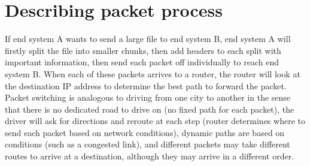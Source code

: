 \documentclass{article}
\begin{document}
\section{Describing packet process}
If end system A wants to send a large file to end system B, end system A will firstly split the file into smaller chunks, then add headers to each split with important information, then send each packet off individually to reach end system B. When each of these packets arrives to a router, the router will look at the destination IP address to determine the best path to forward the packet. Packet switching is analogous to driving from one city to another in the sense that there is no dedicated road to drive on (no fixed path for each packet), the driver will ask for directions and reroute at each step (router determines where to send each packet based on network conditions), dynamic paths are based on conditions (such as a congested link), and different packets may take different routes to arrive at a destination, although they may arrive in a different order.

\setcounter{section}{30}
\section{}
\end{document}
